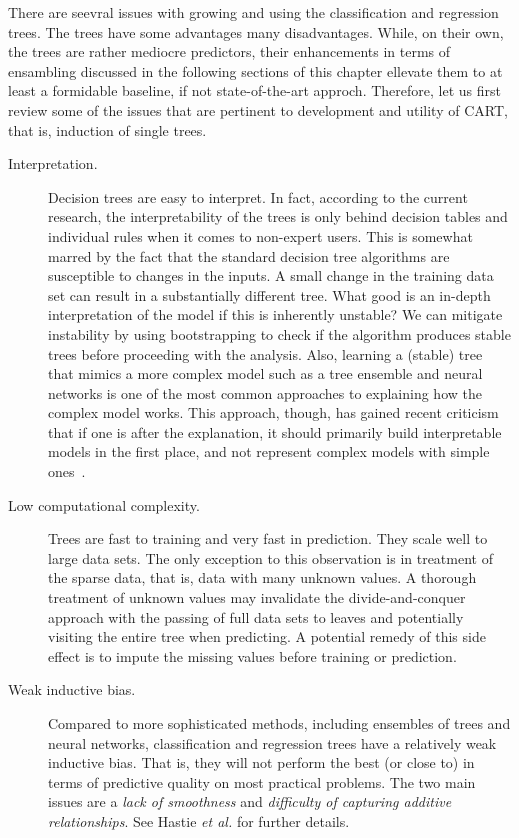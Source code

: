 \begin{refsection}
There are seevral issues with growing and using the classification and regression trees. The trees have some advantages many disadvantages. While, on their own, the trees are rather mediocre predictors, their enhancements in terms of ensambling discussed in the following sections of this chapter ellevate them to at least a formidable baseline, if not state-of-the-art approch. Therefore, let us first review some of the issues that are pertinent to development and utility of CART, that is, induction of single trees.

\begin{description}
\item[Interpretation.] Decision trees are easy to interpret. In fact, according to the current research, the interpretability of the trees is only behind decision tables and individual rules when it comes to non-expert users. This is somewhat marred by the fact that the standard decision tree algorithms are susceptible to changes in the inputs. A small change in the training data set can result in a substantially different tree. What good is an in-depth interpretation of the model if this is inherently unstable? We can mitigate instability by using bootstrapping to check if the algorithm produces stable trees before proceeding with the analysis. Also, learning a (stable) tree that mimics a more complex model such as a tree ensemble and neural networks is one of the most common approaches to explaining how the complex model works. This approach, though, has gained recent criticism that if one is after the explanation, it should primarily build interpretable models in the first place, and not represent complex models with simple ones~\cite{Rudin2019}.

\item[Low computational complexity.] Trees are fast to training and very fast in prediction. They scale well to large data sets. The only exception to this observation is in treatment of the sparse data, that is, data with many unknown values. A thorough treatment of unknown values may invalidate the divide-and-conquer approach with the passing of full data sets to leaves and potentially visiting the entire tree when predicting. A potential remedy of this side effect is to impute the missing values before training or prediction.

\item[Weak inductive bias.] Compared to more sophisticated methods, including ensembles of trees and neural networks, classification and regression trees have a relatively weak inductive bias. That is, they will not perform the best (or close to) in terms of predictive quality on most practical problems. The two main issues are a {\em lack of smoothness} and {\em difficulty of capturing additive relationships}. See Hastie {\em et al.} for further details.


\end{description}
\end{refsection}

